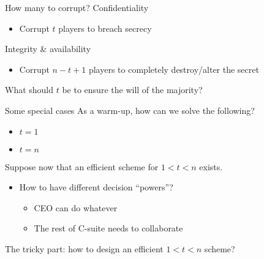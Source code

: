 \begin{frame}{How many to corrupt?}
  Confidentiality
  \begin{itemize}[<+(1)->]
    \item Corrupt $t$ players to breach secrecy
  \end{itemize}

  \vspace*{1em}

  \pause
  Integrity \& availability
  \begin{itemize}[<+(1)->]
    \item Corrupt $n - t + 1$ players to completely destroy/alter the secret
  \end{itemize}

  \vspace*{1em}

  \pause
  What should $t$ be to ensure the will of the majority?
\end{frame}

\begin{frame}{Some special cases}
  As a warm-up, how can we solve the following?
  \begin{itemize}[<+(1)->]
    \item $t = 1$
    \item $t = n$
  \end{itemize}

  \vspace*{1em}

  \pause
  Suppose now that an efficient scheme for $1 < t < n$ exists.
  \begin{itemize}
    \pause \item How to have different decision \enquote{powers}?
    \begin{itemize}
      \pause \item CEO can do whatever
      \item The rest of C-suite needs to collaborate
    \end{itemize}
  \end{itemize}

  \vspace*{1em}

  \pause
  The tricky part: how to design an efficient $1 < t < n$ scheme?
\end{frame}

